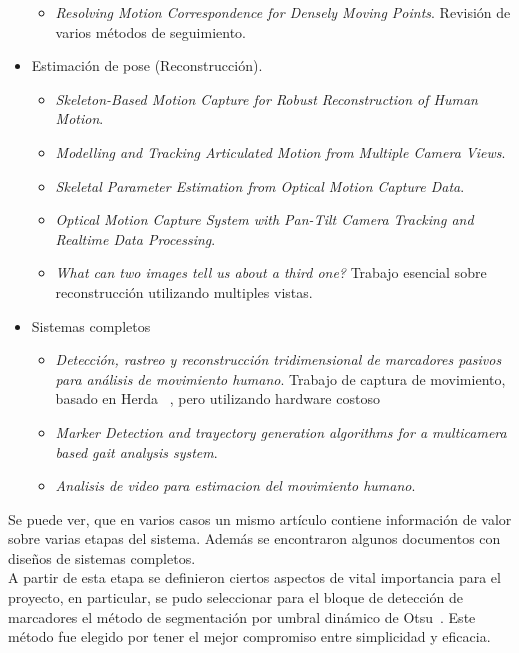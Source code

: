 \begin{itemize}
\begin{itemize}
		\item \emph{Resolving Motion Correspondence for Densely Moving Points}\cite{survey_tracking}. Revisión de varios métodos de seguimiento.
	\end{itemize}
	\item Estimación de pose (Reconstrucción).
	\begin{itemize}
		\item \emph{Skeleton-Based Motion Capture for Robust Reconstruction of Human Motion}\cite{herda}.
		\item \emph{Modelling and Tracking Articulated Motion from Multiple Camera Views}\cite{ringer2000modelling}.
		\item \emph{Skeletal Parameter Estimation from Optical Motion Capture Data}\cite{kirk2005skeletal}.
		\item \emph{Optical Motion Capture System with Pan-Tilt Camera Tracking and  Realtime Data Processing}\cite{kurihara2002optical}.
		\item \emph{What can two images tell us about a third one?}\cite{faugueras} Trabajo esencial sobre reconstrucción utilizando multiples vistas.
	\end{itemize}
	\item Sistemas completos
	\begin{itemize}
		\item \emph{Detección, rastreo y reconstrucción tridimensional de marcadores pasivos para análisis de movimiento humano}\cite{colombianos}.	Trabajo de captura de movimiento, basado en Herda ~\cite{herda}, pero utilizando hardware costoso
		\item \emph{Marker Detection and trayectory generation algorithms for a multicamera based gait analysis system}\cite{shafiq2001marker}.
		\item \emph{Analisis de video para estimacion del movimiento humano}\cite{martinez2009analisis}.
	\end{itemize}
\end{itemize}

Se puede ver, que en varios casos un mismo artículo contiene información de valor sobre varias etapas del sistema. Además se encontraron algunos documentos con diseños de sistemas completos.
\\ 

A partir de esta etapa se definieron ciertos aspectos de vital importancia para el proyecto, en particular, se pudo seleccionar para el bloque de detección de marcadores el método de segmentación por umbral dinámico de Otsu~\cite{otsu}. Este método fue elegido por tener el mejor compromiso entre simplicidad y eficacia.
\\ 

